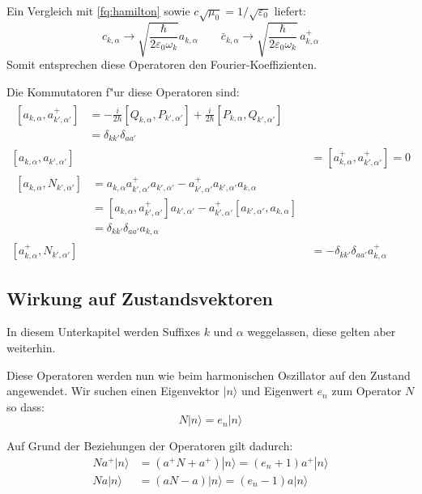 Ein Vergleich mit \ref{fq:hamilton} sowie $c\sqrt{\mu_0}=1/\sqrt{\varepsilon_0}$ liefert:
\begin{equation} \label{fq:opp_fourier}
 c_{k,\alpha} \rightarrow \sqrt{\frac{\hbar}{2 \varepsilon_0 \omega_k}} a_{k,\alpha} \qquad 
 \bar{c}_{k,\alpha} \rightarrow \sqrt{\frac{\hbar}{2 \varepsilon_0 \omega_k}} \, a^+_{k,\alpha}
\end{equation}
Somit entsprechen diese Operatoren den Fourier-Koeffizienten.

Die Kommutatoren f"ur diese Operatoren sind:
\begin{align*}
\begin{split}
[a_{k,\alpha} , a^+_{k',\alpha'}] &= - \frac{i}{2 \hbar} [Q_{k,\alpha}, P_{k',\alpha'}] + \frac{i}{2 \hbar} [P_{k,\alpha}, Q_{k',\alpha'}] \\
	 &= \delta_{kk'}\delta_{aa'}
\end{split}\\
[a_{k,\alpha} , a_{k',\alpha'}] &= [a^+_{k,\alpha} , a^+_{k',\alpha'}] = 0 \\
\begin{split}
[a_{k,\alpha} , N_{k',\alpha'}] &= a_{k,\alpha} a^+_{k',\alpha'} a_{k',\alpha'} - a^+_{k',\alpha'} a_{k',\alpha'} a_{k,\alpha} \\
	&= [a_{k,\alpha} , a^+_{k',\alpha'}]a_{k',\alpha'} - a^+_{k',\alpha'}[a_{k',\alpha'} , a_{k,\alpha}]\\
	&= \delta_{kk'}\delta_{aa'} a_{k,\alpha}
\end{split} \\
[a^+_{k,\alpha} , N_{k',\alpha'}] &= -\delta_{kk'}\delta_{aa'} a^+_{k,\alpha}
\end{align*}

\subsection{Wirkung auf Zustandsvektoren}

In diesem Unterkapitel werden Suffixes $k$ und $\alpha$ weggelassen, diese gelten aber weiterhin. 

Diese Operatoren werden nun wie beim harmonischen Oszillator auf den Zustand angewendet. Wir suchen einen Eigenvektor $|n\rangle$ und Eigenwert $e_n$ zum Operator $N$ so dass:
\begin{equation*}
N|n\rangle = e_n|n\rangle
\end{equation*}

Auf Grund der Beziehungen der Operatoren gilt dadurch:
\begin{align*}
Na^+|n\rangle &= (a^+N + a^+)|n\rangle = (e_n + 1)a^+|n\rangle \\
Na|n\rangle &= (aN - a)|n\rangle = (e_n - 1)a|n\rangle
\end{align*}

